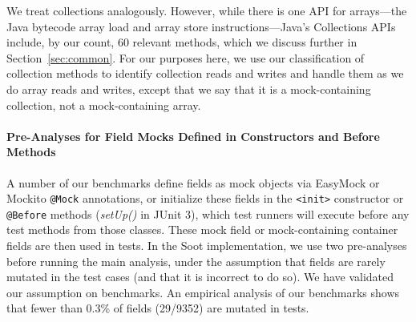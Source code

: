 
We treat collections analogously. However, while there is one API for arrays---the Java bytecode array load and array store instructions---Java's Collections APIs include, by our count, 60 relevant methods, which we discuss further in Section~\ref{sec:common}. For our purposes here, we use our classification of collection methods to identify collection reads and writes and handle them as we do array reads and writes, except that we say that it is a mock-containing collection, not a mock-containing array.


\paragraph{Pre-Analyses for Field Mocks Defined in Constructors and Before Methods}
A number of our benchmarks define fields as mock objects via EasyMock or Mockito \texttt{@Mock} annotations, or initialize these fields in the \texttt{<init>} constructor or \texttt{@Before} methods (\textit{setUp()} in JUnit 3), which test runners will execute before any test methods from those classes. These mock field or mock-containing container fields are then used in tests. In the Soot implementation, we use two pre-analyses before running the main analysis, under the assumption that fields are rarely mutated in the test cases (and that it is incorrect to do so). We have validated our assumption on benchmarks. An empirical analysis of our benchmarks shows that fewer than 0.3\% of fields (29/9352) are mutated in tests.

